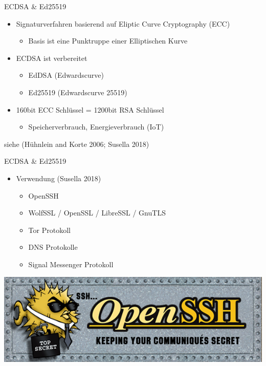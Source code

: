 \documentclass[
  10pt,
  ignorenonframetext,
  aspectratio=43,
]{beamer}
\providecommand{\tightlist}{%
  \setlength{\itemsep}{0pt}\setlength{\parskip}{0pt}}
\begin{document}
\begin{frame}{ECDSA \& Ed25519}
\protect\hypertarget{ecdsa-ed25519}{}
\begin{itemize}
\item
  Signaturverfahren basierend auf Eliptic Curve Cryptography (ECC)

  \begin{itemize}
  \tightlist
  \item
    Basis ist eine Punktruppe einer Elliptischen Kurve
  \end{itemize}
\item
  ECDSA ist verbereitet

  \begin{itemize}
  \item
    EdDSA (Edwardscurve)
  \item
    Ed25519 (Edwardscurve 25519)
  \end{itemize}
\item
  160bit ECC Schlüssel = 1200bit RSA Schlüssel

  \begin{itemize}
  \tightlist
  \item
    Speicherverbrauch, Energieverbrauch (IoT)
  \end{itemize}
\end{itemize}

siehe (Hühnlein and Korte 2006; Susella 2018)
\end{frame}

\begin{frame}{ECDSA \& Ed25519}
\protect\hypertarget{ecdsa-ed25519-1}{}
\begin{itemize}
\tightlist
\item
  Verwendung (Susella 2018)

  \begin{itemize}
  \tightlist
  \item
    OpenSSH
  \item
    WolfSSL / OpenSSL / LibreSSL / GnuTLS
  \item
    Tor Protokoll
  \item
    DNS Protokolle
  \item
    Signal Messenger Protokoll
  \end{itemize}
\end{itemize}

\includegraphics[width=\textwidth,height=0.5\textheight]{Abbildungen/openssh.png}
\end{frame}
\end{document}
